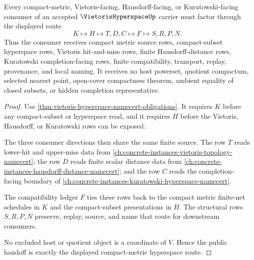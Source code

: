 \begin{theorem}
\label{thm:vietoris-hyperspace-compact-metric-handoff}
Every compact-metric, Vietoris-facing, Hausdorff-facing, or Kuratowski-facing consumer of an accepted $\VietorisHyperspaceUp$ carrier must factor through the displayed route
$$
K \longmapsto H \longmapsto T,D,C \longmapsto F \longmapsto S,R,P,N.
$$
Thus the consumer receives compact metric source rows, compact-subset hyperspace rows, Vietoris hit-and-miss rows, finite Hausdorff-distance rows, Kuratowski completion-facing rows, finite compatibility, transport, replay, provenance, and local naming. It receives no host powerset, quotient compactum, selected nearest point, open-cover compactness theorem, ambient equality of closed subsets, or hidden completion representative.
\end{theorem}
\begin{proof}
Use \autoref{thm:vietoris-hyperspace-namecert-obligations}. It requires $K$ before any compact-subset or hyperspace read, and it requires $H$ before the Vietoris, Hausdorff, or Kuratowski rows can be exposed.

The three consumer directions then share the same finite source. The row $T$ reads lower-hit and upper-miss data from \autoref{ch:concrete-instances-vietoris-topology-namecert}; the row $D$ reads finite scalar distance data from \autoref{ch:concrete-instances-hausdorff-distance-namecert}; and the row $C$ reads the completion-facing boundary of \autoref{ch:concrete-instances-kuratowski-hyperspace-namecert}.

The compatibility ledger $F$ ties these rows back to the compact metric finite-net schedules in $K$ and the compact-subset presentations in $H$. The structural rows $S,R,P,N$ preserve, replay, source, and name that route for downstream consumers.

No excluded host or quotient object is a coordinate of $V$. Hence the public handoff is exactly the displayed compact-metric hyperspace route.
\end{proof}



